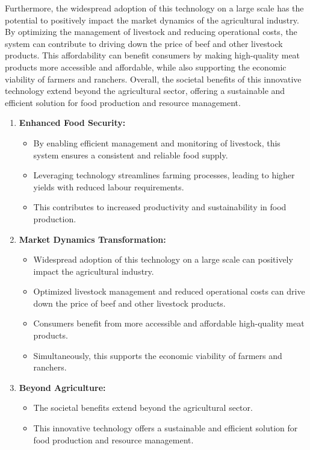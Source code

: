 \documentclass[conference]{main}
\begin{document}
Furthermore, the widespread adoption of this technology on a large scale has the
potential to positively impact the market dynamics of the agricultural industry.
By optimizing the management of livestock and reducing operational costs, the
system can contribute to driving down the price of beef and other livestock
products. This affordability can benefit consumers by making high-quality meat
products more accessible and affordable, while also supporting the economic
viability of farmers and ranchers. Overall, the societal benefits of this
innovative technology extend beyond the agricultural sector, offering a
sustainable and efficient solution for food production and resource management.

\begin{enumerate}

    \item \textbf{Enhanced Food Security:}
        \begin{itemize}
        \item   By enabling efficient management and monitoring of livestock, this system ensures a consistent and reliable food supply.
        \item   Leveraging technology streamlines farming processes, leading to higher yields with reduced labour requirements.
        \item   This contributes to increased productivity and sustainability in food production.
        \end{itemize}

    \item \textbf{Market Dynamics Transformation:}
        \begin{itemize}
        \item   Widespread adoption of this technology on a large scale can positively impact the agricultural industry.
        \item   Optimized livestock management and reduced operational costs can drive down the price of beef and other livestock products.
        \item   Consumers benefit from more accessible and affordable high-quality meat products.
        \item   Simultaneously, this supports the economic viability of farmers and ranchers.
        \end{itemize}

    \item \textbf{Beyond Agriculture:}
        \begin{itemize}
        \item   The societal benefits extend beyond the agricultural sector.
        \item   This innovative technology offers a sustainable and efficient solution for food production and resource management.
        \end{itemize}

\end{enumerate}
\end{document}
